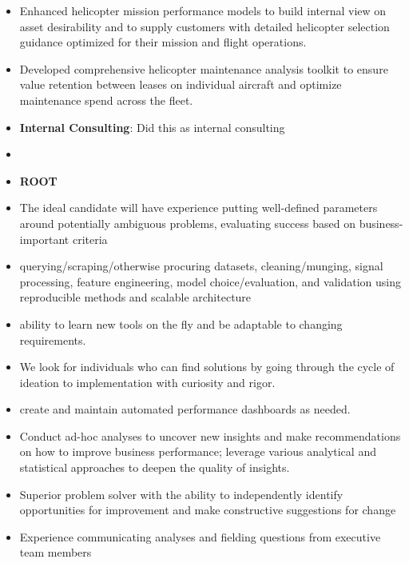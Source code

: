 \documentclass[11pt,letterpaper,sans]{moderncv} %
\begin{document}
\vspace{-1.5\baselineskip}
\begin{itemize}
\item Enhanced helicopter mission performance models to build internal view on asset desirability and to supply customers with detailed helicopter selection guidance optimized for their mission and flight operations.
\item Developed comprehensive helicopter maintenance analysis toolkit to ensure value retention between leases on individual aircraft and optimize maintenance spend across the fleet. 
\item \textbf{Internal Consulting}: Did this as internal consulting 
\item   

\item \textbf{ROOT}
\item The ideal candidate will have experience putting well-defined parameters around potentially ambiguous problems, evaluating success based on business-important criteria
\item querying/scraping/otherwise procuring datasets, cleaning/munging, signal processing, feature engineering, model choice/evaluation, and validation using reproducible methods and scalable architecture
\item ability to learn new tools on the fly and be adaptable to changing requirements.
\item We look for individuals who can find solutions by going through the cycle of ideation to implementation with curiosity and rigor.
\item create and maintain automated performance dashboards as needed.
\item Conduct ad-hoc analyses to uncover new insights and make recommendations on how to improve business performance; leverage various analytical and statistical approaches to deepen the quality of insights.
\item Superior problem solver with the ability to independently identify opportunities for improvement and make constructive suggestions for change
\item Experience communicating analyses and fielding questions from executive team members
















\end{itemize}
\end{document}
